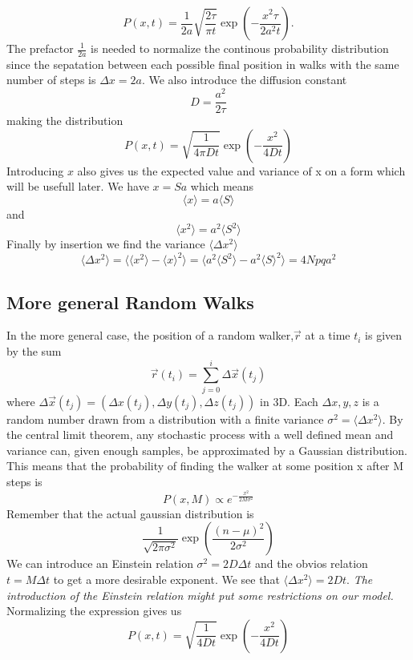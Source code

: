 \begin{equation}
 P(x,t) = \frac{1}{2a}\sqrt{\frac{2\tau}{\pi t}}\exp\left(-\frac{x^2\tau}{2a^2t}\right). 
\end{equation}
The prefactor $\frac{1}{2a}$ is needed to normalize the continous probability distribution since the sepatation between each possible final position in walks with the same number of steps is $\Delta x=2a$. 
We also introduce the diffusion constant
\begin{equation}
D = \frac{a^2}{2\tau} 
\end{equation}
making the distribution
\begin{equation}
 P(x,t) = \sqrt{\frac{1}{4\pi Dt}}\exp\left(-\frac{x^2}{4Dt}\right)
\end{equation}
Introducing $x$ also gives us the expected value and variance of x on a form which will be usefull later. 
We have $x=Sa$ which means 
$$\langle x\rangle=a\langle S\rangle$$ 
and 
$$\langle x^2\rangle=a^2\langle S^2\rangle$$
Finally by insertion we find the variance $\langle \Delta x^2\rangle$
\begin{equation}\label{random_walk_variance}
 \langle \Delta x^2\rangle = \langle\langle x^2\rangle -\langle x\rangle^2\rangle = \langle a^2\langle S^2\rangle -a^2\langle S\rangle^2\rangle = 4Npqa^2
\end{equation}


\subsection{More general Random Walks}\label{more_general_random_walks}

In the more general case, the position of a random walker,$\vec{r}$ at a time $t_i$ is given by the sum
\begin{equation}\label{brownian_motion}
 \vec{r}(t_i)=\sum\limits_{j=0}^i \Delta \vec{x}(t_j)
\end{equation}
where $\Delta \vec{x}(t_j) = \left(\Delta x(t_j),\Delta y(t_j),\Delta z(t_j)\right)$ in 3D. Each $\Delta x,y,z$ is a random number drawn from a distribution with a finite variance $\sigma^2 = \langle\Delta x^2\rangle$. 
By the central limit theorem, any stochastic process with a well defined mean and variance can, given enough samples, be approximated by a Gaussian distribution. 
This means that the probability of finding the walker at some position x after M steps is 
\begin{equation}
 P(x,M)\propto e^{-\frac{x^2}{2M\sigma^2}}
\end{equation}
Remember that the actual gaussian distribution is 
$$
\frac{1}{\sqrt{2\pi\sigma^2}}\exp\left(\frac{(n-\mu)^2}{2\sigma^2}\right)
$$
We can introduce an Einstein relation $\sigma^2 = 2D\Delta t$ and the obvios relation $t = M\Delta t$ to get a more desirable exponent.
We see that $\langle \Delta x^2\rangle = 2Dt$. 
\emph{The introduction of the Einstein relation might put some restrictions on our model.}
Normalizing the expression gives us 
\begin{equation}\label{rw_gaussian_distribution}
 P(x,t) = \sqrt{\frac{1}{4Dt}}\exp\left(-\frac{x^2}{4Dt}\right)
\end{equation}

